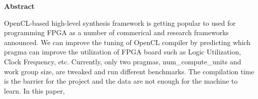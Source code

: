 \thispagestyle{plain}
\begin{center}
    \textbf{Abstract}
\end{center}
OpenCL-based high-level synthesis framework is getting popular to used for programming FPGA as a number of commerical and research frameworks announced. We can improve the tuning of OpenCL compiler by predicting which pragma can improve the utilization of FPGA board such as Logic Utilization, Clock Frequency, etc. Currently, only two pragmas, num\_compute\_units and work group size, are tweaked and run different benchmarks. The compilation time is the barrier for the project and the data are not enough for the machine to learn.
In this paper, 